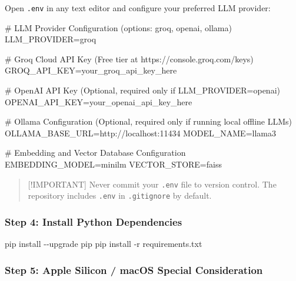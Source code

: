 \documentclass[
]{article}
\newenvironment{Shaded}{}{}
\newcommand{\AttributeTok}[1]{\textcolor[rgb]{0.49,0.56,0.16}{#1}}
\newcommand{\ExtensionTok}[1]{#1}
\newcommand{\NormalTok}[1]{#1}
\begin{document}
Open \texttt{.\allowbreak env} in any text editor and configure your preferred LLM
provider:

\begin{Shaded}
\begin{Highlighting}[]
\NormalTok{\# LLM Provider Configuration (options: groq, openai, ollama)}
\NormalTok{LLM\_PROVIDER=groq}

\NormalTok{\# Groq Cloud API Key (Free tier at https://console.groq.com/keys)}
\NormalTok{GROQ\_API\_KEY=your\_groq\_api\_key\_here}

\NormalTok{\# OpenAI API Key (Optional, required only if LLM\_PROVIDER=openai)}
\NormalTok{OPENAI\_API\_KEY=your\_openai\_api\_key\_here}

\NormalTok{\# Ollama Configuration (Optional, required only if running local offline LLMs)}
\NormalTok{OLLAMA\_BASE\_URL=http://localhost:11434}
\NormalTok{MODEL\_NAME=llama3}

\NormalTok{\# Embedding and Vector Database Configuration}
\NormalTok{EMBEDDING\_MODEL=minilm}
\NormalTok{VECTOR\_STORE=faiss}
\end{Highlighting}
\end{Shaded}

\begin{quote}
{[}!IMPORTANT{]} Never commit your \texttt{.\allowbreak env} file to version
control. The repository includes \texttt{.\allowbreak env} in \texttt{.\allowbreak gitignore} by
default.
\end{quote}

\subsubsection{Step 4: Install Python
Dependencies}\label{step-4-install-python-dependencies}

\begin{Shaded}
\begin{Highlighting}[]
\ExtensionTok{pip}\NormalTok{ install }\AttributeTok{{-}{-}upgrade}\NormalTok{ pip}
\ExtensionTok{pip}\NormalTok{ install }\AttributeTok{{-}r}\NormalTok{ requirements.txt}
\end{Highlighting}
\end{Shaded}

\subsubsection{Step 5: Apple Silicon / macOS Special
Consideration}\label{step-5-apple-silicon-macos-special-consideration}
\end{document}

